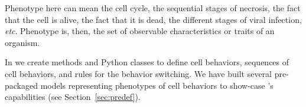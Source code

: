 Phenotype here can mean the cell cycle, the sequential stages of necrosis, the fact that the cell is alive, the fact that it is dead, the different stages of viral infection, \textit{etc}. Phenotype is, then, the set of observable characteristics or traits of an organism.

In \pcps we create methods and Python classes to define cell behaviors, sequences of cell behaviors, and rules for the behavior switching. We have built several pre-packaged models representing phenotypes of cell behaviors to show-case \pcp's capabilities (see Section~\ref{sec:predef}). 




